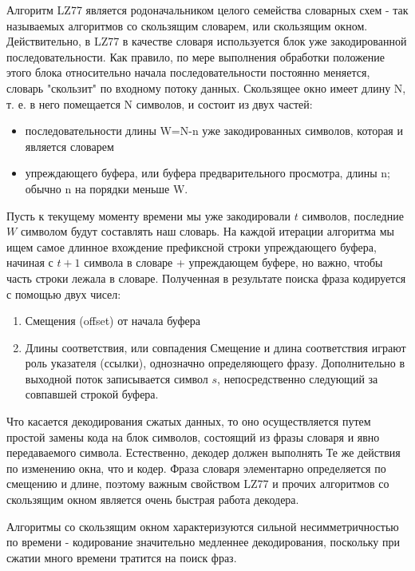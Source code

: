 \documentclass[12pt]{article}
\begin{document}
Алгоритм LZ77 является родоначальником целого семейства словарных схем - так называемых
алгоритмов со скользящим словарем, или скользящим окном. Действительно,
в LZ77 в качестве словаря используется блок уже закодированной последовательности.
Как правило, по мере выполнения обработки положение этого блока относительно начала
последовательности постоянно меняется, словарь "скользит" по входному потоку данных.
Скользящее окно имеет длину N, т. е. в него помещается N символов, и состоит из двух
частей:

\begin{itemize}
    \item последовательности длины W=N-n уже закодированных символов, которая и является словарем
    \item упреждающего буфера, или буфера предварительного просмотра,
          длины n; обычно n на порядки меньше W.
\end{itemize}

Пусть к текущему моменту времени мы уже закодировали $t$ символов, последние $W$ символом будут
составлять наш словарь. На каждой итерации алгоритма мы ищем самое длинное вхождение префиксной
строки упреждающего буфера, начиная с $t+1$ символа в словаре + упреждающем буфере,
но важно, чтобы часть строки лежала в словаре. Полученная в результате поиска фраза
кодируется с помощью двух чисел:

\begin{enumerate}
    \item Смещения (offset) от начала буфера
    \item Длины соответствия, или совпадения
          Смещение и длина соответствия играют роль указателя (ссылки),
          однозначно определяющего фразу.
          Дополнительно в выходной поток записывается символ $s$,
          непосредственно следующий за совпавшей строкой буфера.

\end{enumerate}

Что касается декодирования сжатых данных, то оно осуществляется путем простой
замены кода на блок символов, состоящий из фразы словаря и явно передаваемого символа.
Естественно, декодер должен выполнять Те же действия по изменению окна,
что и кодер. Фраза словаря элементарно определяется по смещению и длине,
поэтому важным свойством LZ77 и прочих алгоритмов со скользящим окном является очень
быстрая работа декодера.

Алгоритмы со скользящим окном характеризуются сильной несимметричностью по времени - кодирование значительно медленнее декодирования,
поскольку при сжатии много времени тратится на поиск фраз.
\end{document}
